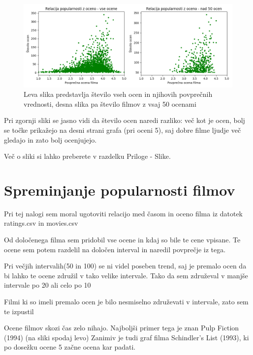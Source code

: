 \documentclass[a4paper,11pt]{article}
\begin{document}
	\begin{figure}[htbp]
		\begin{center}
			\includegraphics[scale=0.7]{slike/graph2_popularnost_ocena.png}
			\caption{Leva slika predstavlja število vseh ocen in njihovih povprečnih vrednosti, desna slika pa število filmov z vsaj 50 ocenami}
			\label{slika2}
		\end{center}
	\end{figure}

	Pri zgornji sliki se jasno vidi da število ocen naredi razliko: več kot je ocen, bolj se točke prikažejo na desni strani grafa (pri oceni 5), saj dobre filme ljudje več gledajo in zato bolj ocenjujejo.
	
	Več o sliki si lahko preberete v razdelku Priloge - Slike.
	\section{Spreminjanje popularnosti filmov}
	Pri tej nalogi sem moral ugotoviti relacijo med časom in oceno filma iz datotek ratings.csv in movies.csv
	
	Od določenega filma sem pridobil vse ocene in kdaj so bile te cene vpisane. Te ocene sem potem razdelil na določen interval in naredil povprečje iz tega.
	
	Pri večjih intervalih(50 in 100) se ni videl poseben trend, saj je premalo ocen da bi lahko te ocene združil v tako velike intervale. Tako da sem združeval v manjše intervale po 20 ali celo po 10
	
	Filmi ki so imeli premalo ocen je bilo nesmiselno združevati v intervale, zato sem te izpustil
	
	Ocene filmov skozi čas zelo nihajo. Najboljši primer tega je znan Pulp Fiction (1994) (na sliki spodaj levo)
	Zanimiv je tudi graf filma Schindler's List (1993), ki po dosežku ocene 5 začne ocena kar padati.
\end{document}
